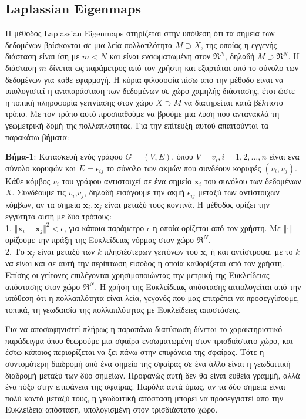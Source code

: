 \subsection{\textlatin{Laplassian Eigenmaps}}
\par
Η μέθοδος \textlatin{Laplassian Eigenmaps}\textlatin{\cite{laplassianeigenmaps}} στηρίζεται στην υπόθεση ότι τα σημεία των δεδομένων βρίσκονται σε μια λεία πολλαπλότητα $ Μ \supset Χ $, της οποίας η εγγενής διάσταση είναι ίση με $m<N$ και είναι ενσωματωμένη στον $ \Re^{N} $, δηλαδή $ Μ \supset \Re^{N} $. Η διάσταση $m$ δίνεται ως παράμετρος από τον χρήστη και εξαρτάται από το σύνολο των δεδομένων για κάθε εφαρμογή. Η κύρια φιλοσοφία πίσω από την μέθοδο είναι να υπολογιστεί η αναπαράσταση των δεδομένων σε χώρο χαμηλής διάστασης, έτσι ώστε η τοπική πληροφορία γειτνίασης στον χώρο $Χ \supset M$ να διατηρείται κατά βέλτιστο τρόπο. Με τον τρόπο αυτό προσπαθούμε να βρούμε μια λύση που αντανακλά τη γεωμετρική δομή της πολλαπλότητας. Για την επίτευξη αυτού απαιτούνται τα παρακάτω βήματα:
\par
\textbf{Βήμα-1}: Κατασκευή ενός γράφου $G=(V,E)$, όπου $V={v_{i},i=1,2,\ldots,n}$ είναι ένα σύνολο κορυφών και $E={\epsilon_{ij}}$ το σύνολο των ακμών που συνδέουν κορυφές $(v_{i},v_{j})$. Κάθε κόμβος $v_{i}$ του γράφου αντιστοιχεί σε ένα σημείο $\mathbf{x}_{i}$ του συνόλου των δεδομένων $X$. Συνδέουμε τις $v_{i}$,$v_{j}$, δηλαδή εισάγουμε την ακμή $\epsilon_{ij}$ μεταξύ των αντίστοιχων κόμβων, αν τα σημεία $\mathbf{x}_{i},\mathbf{x}_{j}$ είναι μεταξύ τους κοντινά. Η μέθοδος ορίζει την εγγύτητα αυτή με δύο τρόπους: \\
1. $\Vert \mathbf{x}_{i}-\mathbf{x}_{j} \Vert ^{2} < \epsilon $, για κάποια παράμετρο $\epsilon$ η οποία ορίζεται από τον χρήστη. Με $\Vert\cdot\Vert$ ορίζουμε την πράξη της Ευκλείδειας νόρμας στον χώρο $\Re^{N}$. \\
2. Το $\mathbf{x}_{j}$ είναι μεταξύ των $k$ πλησιέστερων γειτόνων του $\mathbf{x}_{i}$ ή και αντίστροφα, με το $k$ να είναι και σε αυτή την περίπτωση είσοδος η οποία καθορίζεται από τον χρήστη. Επίσης οι γείτονες επιλέγονται χρησιμοποιώντας την μετρική της Ευκλείδειας απόστασης στον χώρο $\Re^{N}$. Η χρήση της Ευκλείδειας απόστασης αιτιολογείται από την υπόθεση ότι η πολλαπλότητα είναι λεία, γεγονός που μας επιτρέπει να προσεγγίσουμε, τοπικά, τη γεωδαισία της πολλαπλότητας με Ευκλείδειες αποστάσεις.
\par
Για να αποσαφηνιστεί πλήρως η παραπάνω διατύπωση δίνεται το χαρακτηριστικό παράδειγμα όπου θεωρούμε μια σφαίρα ενσωματωμένη στον τρισδιάστατο χώρο, και έστω κάποιος περιορίζεται να ζει πάνω στην επιφάνεια της σφαίρας. Τότε η συντομότερη διαδρομή από ένα σημείο της σφαίρας σε ένα άλλο είναι η γεωδαιτική διαδρομή μεταξύ των δύο σημείων. Προφανώς αυτή δεν θα είναι ευθεία γραμμή, αλλά ένα τόξο στην επιφάνεια της σφαίρας. Παρόλα αυτά όμως, αν τα δύο σημεία είναι πολύ κοντά μεταξύ τους, η γεωδαιτική απόσταση μπορεί να προσεγγιστεί από την Ευκλείδεια απόσταση, υπολογισμένη στον τρισδιάστατο χώρο.
